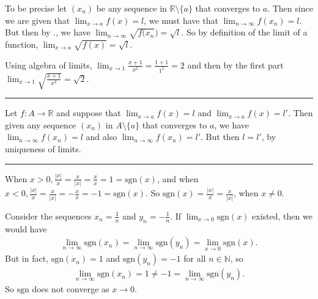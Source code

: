 \documentclass[letterpaper,10pt,english]{jupyterBook}
\begin{document}
To be precise let \((x_{n})\) be any sequence in \(\mathbb{R} \setminus \{a\}\) that converges to \(a\). Then since we are given that \(\lim_{x \rightarrow a} f(x) = l\), we must have that \(\lim_{n\rightarrow\infty} f(x_{n}) = l\). But then by {\hyperref[\detokenize{Problems:p4}]{}}., we have \(\lim_{n\rightarrow\infty} \sqrt{f(x_{n}}) = \sqrt{l}\). So by definition of the limit of a function, \(\lim_{x \rightarrow a} \sqrt{f(x)} = \sqrt{l}\).

Using algebra of limits,  \(\lim_{x \rightarrow 1}\displaystyle\frac{x+1}{x^{2}}=\frac{1+1}{1^2}=2\) and
then by the first part \(\lim_{x \rightarrow 1}\sqrt{\displaystyle\frac{x+1}{x^{2}}} = \sqrt{2}\).


\bigskip\hrule\bigskip


\sphinxAtStartPar
{\hyperref[\detokenize{Problems:id6}]{}} Let \(f:A\to \mathbb{R}\) and suppose that \(\lim_{x \rightarrow a} f(x) = l\) and \(\lim_{x \rightarrow a} f(x) = l'\). Then given any sequence \((x_{n})\) in \(A \setminus \{a\}\) that converges to \(a\), we have \(\lim_{n\rightarrow\infty} f(x_{n}) = l\) and also \(\lim_{n\rightarrow\infty} f(x_{n}) = l'\). But then \(l = l'\), by uniqueness of limits.


\bigskip\hrule\bigskip


\sphinxAtStartPar
{\hyperref[\detokenize{Problems:id7}]{}}
When \(x > 0, \displaystyle\frac{|x|}{x} = \displaystyle\frac{x}{|x|} = \displaystyle\frac{x}{x} = 1 = \text{sgn}(x)\), and when \(x < 0, \displaystyle\frac{|x|}{x} = \displaystyle\frac{x}{|x|} = -\displaystyle\frac{x}{x} = -1 = \text{sgn}(x)\). So \(\text{sgn}(x) = \displaystyle\frac{|x|}{x} = \displaystyle\frac{x}{|x|}\), when \(x\neq 0\).

Consider the sequences \(x_n=\frac{1}{n}\) and \(y_n=-\frac{1}{n}\). If \(\lim_{x\rightarrow 0}\text{sgn}(x)\) existed, then we would have
\begin{equation*}
\begin{split}
\lim_{n\rightarrow\infty}\text{sgn}(x_n)=\lim_{n\rightarrow\infty}\text{sgn}(y_n)=\lim_{x\rightarrow 0}\text{sgn}(x).
\end{split}
\end{equation*}
\sphinxAtStartPar
But in fact, \(\text{sgn}(x_n)=1\) and \(\text{sgn}(y_n)=-1\) for all \(n\in\mathbb{N}\), so
\begin{equation*}
\begin{split}
\lim_{n\rightarrow\infty}\text{sgn}(x_n)=1\neq-1=\lim_{n\rightarrow\infty}\text{sgn}(y_n).
\end{split}
\end{equation*}
\sphinxAtStartPar
So \(\text{sgn}\) does not converge as \(x\rightarrow 0\).
\end{document}
